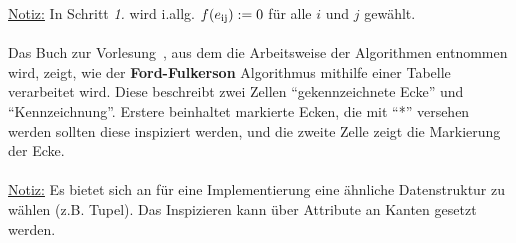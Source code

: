 \documentclass[11pt]{article}
\begin{document}
\underline{Notiz:} In Schritt \textit{1.} wird i.allg. $f(e\textsubscript{ij}) := 0$ f\"ur alle $i$ und $j$ gew\"ahlt.\\~\\
Das Buch zur Vorlesung~\cite{grbuch}, aus dem die Arbeitsweise der Algorithmen entnommen wird, zeigt, wie der \textbf{Ford-Fulkerson} Algorithmus mithilfe einer Tabelle verarbeitet wird. Diese beschreibt zwei Zellen "`gekennzeichnete Ecke"' und "`Kennzeichnung"'. Erstere beinhaltet markierte Ecken, die mit "`*"' versehen werden sollten diese inspiziert werden, und die zweite Zelle zeigt die Markierung der Ecke.\\~\\
\underline{Notiz:} Es bietet sich an f\"ur eine Implementierung eine \"ahnliche Datenstruktur zu w\"ahlen (z.B. Tupel). Das Inspizieren kann \"uber Attribute an Kanten gesetzt werden.
\end{document}
